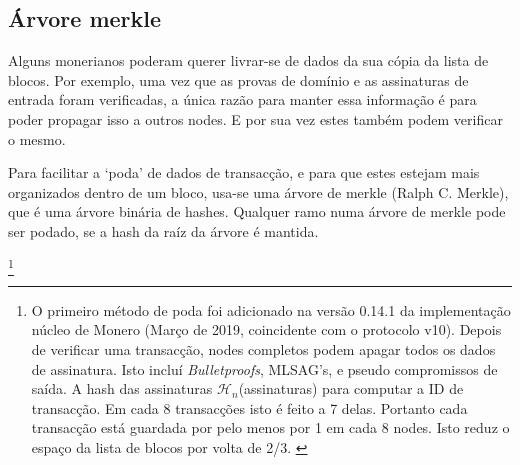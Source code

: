 \subsection{Árvore merkle}
\label{subsec:merkle-tree} %

Alguns monerianos poderam querer livrar-se de dados da sua cópia da lista de blocos. Por exemplo, uma vez que as provas de domínio e as assinaturas de entrada foram verificadas, a única razão para manter essa informação é para poder propagar isso a outros nodes. E por sua vez estes também podem verificar o mesmo.
   

Para facilitar a `poda' de dados de transacção, e para que estes estejam mais organizados dentro de um bloco, usa-se uma árvore de merkle (Ralph C. Merkle)\cite{merkle-tree}, que é uma árvore binária de hashes. Qualquer ramo numa árvore de merkle pode ser podado, se a hash da raíz da árvore é mantida.  

\footnote{O primeiro método de poda foi adicionado na versão 0.14.1 da implementação núcleo de Monero (Março de 2019, coincidente com o protocolo v10). Depois de verificar uma transacção, nodes completos podem apagar todos os dados de assinatura. Isto incluí {\em Bulletproofs}, MLSAG's, e pseudo compromissos de saída. A hash das assinaturas $\mathcal{H}_n$(assinaturas) para computar a ID de transacção. Em cada 8 transacções isto é feito a 7 delas. Portanto cada transacção está guardada por pelo menos por 1 em cada 8 nodes. Isto reduz o espaço da lista de blocos por volta de 2/3. \cite{monero-pruning-1/8}}\\   

